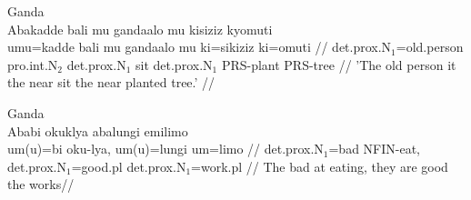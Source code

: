 \documentclass[12pt]{article}
\begin{document}
    \singlespacing
    \setlength{\parindent}{36pt}

    \ex Ganda \\ Abakadde bali mu gandaalo mu kisiziz kyomuti \\ \begingl[glspace=0.4em]
    \gla umu=kadde bali mu gandaalo mu ki=sikiziz ki=omuti // \glb det.prox.N$_{1}$=old.person
    pro.int.N$_{2}$ det.prox.N$_{1}$ sit det.prox.N$_{1}$ PRS-plant PRS-tree //
    \glft 'The old person it the near sit the near planted tree.' // \endgl \xe

    \ex Ganda \\ Ababi okuklya abalungi emilimo \\ \begingl \gla um(u)=bi oku-lya,
    um(u)=lungi um=limo // \glb det.prox.N$_{1}$=bad NFIN-eat, det.prox.N$_{1}$=good.pl
    det.prox.N$_{1}$=work.pl // \glft The bad at eating, they are good the works//\endgl
    \xe
\end{document}
